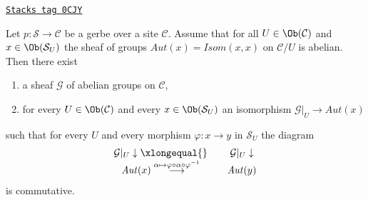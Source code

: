\begin{lemma}
\label{stacks-lemma-gerbe-abelian-auts}
\href{https://stacks.math.columbia.edu/tag/0CJY}{\texttt{Stacks tag 0CJY}}

Let $p : \mathcal{S} \to \mathcal{C}$ be a gerbe over a site $\mathcal{C}$.
Assume that for all $U \in \Ob(\mathcal{C})$ and $x \in \Ob(\mathcal{S}_U)$
the sheaf of groups $\mathit{Aut}(x) = \mathit{Isom}(x, x)$ on $\mathcal{C}/U$
is abelian. Then there exist
\begin{enumerate}
\item a sheaf $\mathcal{G}$ of abelian groups on $\mathcal{C}$,
\item for every $U \in \Ob(\mathcal{C})$ and every $x \in \Ob(\mathcal{S}_U)$
an isomorphism $\mathcal{G}|_U \to \mathit{Aut}(x)$
\end{enumerate}
such that for every $U$ and every morphism $\varphi : x \to y$
in $\mathcal{S}_U$ the diagram
$$
\begin{array}{ccc}\mathcal{G}|_U \downarrow\xlongequal{} &  & \mathcal{G}|_U \downarrow \\ \mathit{Aut}(x)
\overset{\alpha \mapsto \varphi \circ \alpha \circ \varphi^{-1}}{\longrightarrow} &  & \mathit{Aut}(y)\end{array}
$$
is commutative.
\end{lemma}

